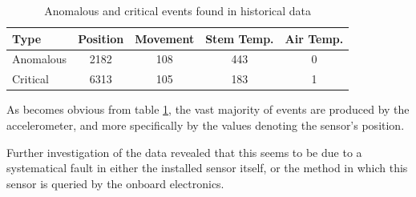 \begin{table}[tb]
    \centering
    \caption{Anomalous and critical events found in historical data}
    \label{tab:evaluation:anomalies}
    \begin{tabular}{lcccc}
        \toprule
        Type & Position & Movement & Stem Temp. & Air Temp.  \\ \midrule
        Anomalous & 2182 & 108 & 443 & 0 \\
        Critical & 6313 & 105 & 183 & 1 \\
        \bottomrule
    \end{tabular}
\end{table}

As becomes obvious from table \ref{tab:evaluation:anomalies}, the vast majority of events are produced by the accelerometer, and more specifically by the values denoting the sensor's position.

Further investigation of the data revealed that this seems to be due to a systematical fault in either the installed sensor itself, or the method in which this sensor is queried by the onboard electronics.
